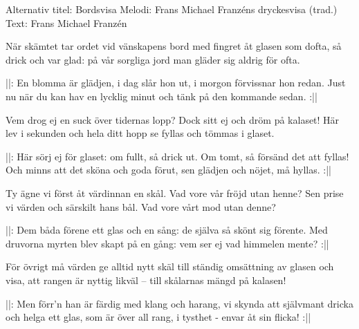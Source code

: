 \begin{song}

\begin{songmeta}
Alternativ titel: Bordsvisa
Melodi: Frans Michael Franzéns dryckesvisa (trad.)
Text: Frans Michael Franzén
\end{songmeta}

\begin{songtext}
När skämtet tar ordet vid vänskapens bord
med fingret åt glasen som dofta,
så drick och var glad: på vår sorgliga jord
man gläder sig aldrig för ofta.

||: En blomma är glädjen, i dag slår hon ut,
i morgon förvissnar hon redan.
Just nu när du kan hav en lycklig minut
och tänk på den kommande sedan. :||

Vem drog ej en suck över tidernas lopp?
Dock sitt ej och dröm på kalaset!
Här lev i sekunden och hela ditt hopp
se fyllas och tömmas i glaset.

||: Här sörj ej för glaset: om fullt, så drick ut.
Om tomt, så försänd det att fyllas!
Och minns att det sköna och goda förut,
sen glädjen och nöjet, må hyllas. :||

Ty ägne vi först åt värdinnan en skål.
Vad vore vår fröjd utan henne?
Sen prise vi värden och särskilt hans bål.
Vad vore vårt mod utan denne?

||: Dem båda förene ett glas och en sång:
de själva så skönt sig förente.
Med druvorna myrten blev skapt på en gång:
vem ser ej vad himmelen mente? :||

För övrigt må värden ge alltid nytt skäl
till ständig omsättning av glasen
och visa, att rangen är nyttig likväl --
till skålarnas mängd på kalasen!

||: Men förr'n han är färdig med klang och harang,
vi skynda att självmant dricka
och helga ett glas, som är över all rang,
i tysthet - envar åt sin flicka! :||
\end{songtext}

\end{song}
